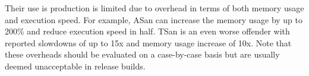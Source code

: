 Their use is production is limited due to overhead in terms of both memory usage
and execution speed. For example, ASan can increase the memory usage by up to
200\% and reduce execution speed in half. TSan is an even worse offender with
reported slowdowns of up to 15x and memory usage increase of 10x. Note that
these overheads should be evaluated on a case-by-case basis but are usually
deemed unacceptable in release builds.

